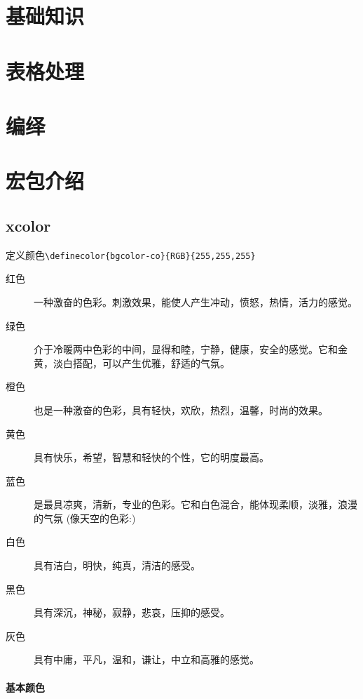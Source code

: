 \documentclass[a4paper]{book}
\begin{document}
\tableofcontents
\chapter{基础知识}




\chapter{表格处理}
\chapter{编绎}
\chapter{宏包介绍}
\section{xcolor}
定义颜色\verb|\definecolor{bgcolor-co}{RGB}{255,255,255}|

    \begin{description}
        \item[红色] 一种激奋的色彩。刺激效果，能使人产生冲动，愤怒，热情，活力的感觉。
        \item[绿色] 介于冷暖两中色彩的中间，显得和睦，宁静，健康，安全的感觉。它和金黄，淡白搭配，可以产生优雅，舒适的气氛。
        \item[橙色] 也是一种激奋的色彩，具有轻快，欢欣，热烈，温馨，时尚的效果。
        \item[黄色] 具有快乐，希望，智慧和轻快的个性，它的明度最高。
        \item[蓝色] 是最具凉爽，清新，专业的色彩。它和白色混合，能体现柔顺，淡雅，浪漫的气氛 (像天空的色彩:)
        \item[白色] 具有洁白，明快，纯真，清洁的感受。
        \item[黑色] 具有深沉，神秘，寂静，悲哀，压抑的感受。
        \item[灰色] 具有中庸，平凡，温和，谦让，中立和高雅的感觉。
    \end{description}

    \newcommand\colorect[2]{\fill[#1](#2)node[above=4pt,right=1pc,black]{#1}rectangle+(1pc,0.618pc);}
    \subsubsection{基本颜色}
\end{document}
